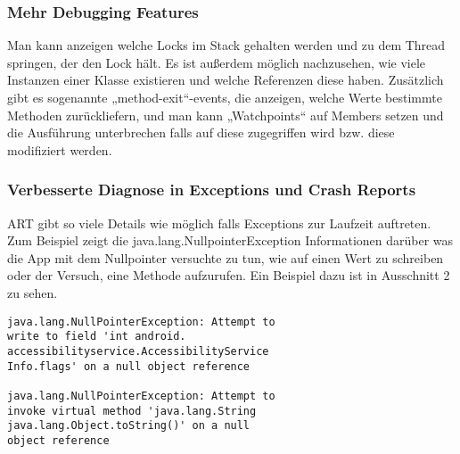 \documentclass[11pt,conference,a4paper]{IEEEtran}
\begin{document}
\subsubsection{Mehr Debugging Features}
Man kann anzeigen welche Locks im Stack gehalten werden und zu dem Thread springen, der den Lock hält. Es ist außerdem möglich nachzusehen, wie viele Instanzen einer Klasse existieren und welche Referenzen diese haben. Zusätzlich gibt es sogenannte „method-exit“-events, die anzeigen, welche Werte bestimmte Methoden zurückliefern, und man kann „Watchpoints“ auf Members setzen und die Ausführung unterbrechen falls auf diese zugegriffen wird bzw. diese modifiziert werden.

\subsubsection{Verbesserte Diagnose in Exceptions und Crash Reports}
ART gibt so viele Details wie möglich falls Exceptions zur Laufzeit auftreten. Zum Beispiel zeigt die java.lang.NullpointerException Informationen darüber was die App mit dem Nullpointer versuchte zu tun, wie auf einen Wert zu schreiben oder der Versuch, eine Methode aufzurufen. Ein Beispiel dazu ist in Ausschnitt 2 zu sehen.

\begin{lstlisting}[float,floatplacement=H,caption=Exception]
java.lang.NullPointerException: Attempt to 
write to field 'int android.
accessibilityservice.AccessibilityService
Info.flags' on a null object reference

java.lang.NullPointerException: Attempt to 
invoke virtual method 'java.lang.String 
java.lang.Object.toString()' on a null 
object reference
\end{lstlisting}





\end{document}
